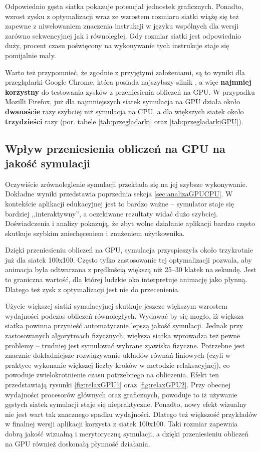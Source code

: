 Odpowiednio gęsta siatka pokazuje potencjał jednostek graficznych. Ponadto,
wzrost zysku z optymalizacji wraz ze wzrostem rozmiaru siatki wiążę się też
zapewne z niwelowaniem znaczenia instrukcji w języku  wspólnych
dla wersji zarówno sekwencyjnej jak i równoległej. Gdy rozmiar siatki jest
odpowiednio duży, procent czasu poświęcony na wykonywanie tych instrukcje staje
się pomijalnie mały.

Warto też przypomnieć, że zgodnie z przyjętymi założeniami, są to wyniki dla
przeglądarki Google Chrome, która posiada najszybszy silnik \js, a więc
\textbf{najmniej korzystny} do testowania zysków z przeniesienia obliczeń na
GPU. W przypadku Mozilli Firefox, już dla najmniejszych siatek symulacja na GPU
działa około \textbf{dwanaście} razy szybciej niż symulacja na CPU, a dla
większych siatek około \textbf{trzydzieści} razy (por. tabele
\ref{tab:przegladarki} oraz \ref{tab:przegladarkiGPU}).

\subsection{Wpływ przeniesienia obliczeń na GPU na jakość symulacji}

Oczywiście zrównoleglenie symulacji przekłada się na jej szybsze wykonywanie.
Dokładne wyniki przedstawia poprzednia sekcja \ref{sec:analizaGPUCPU}. W
kontekście aplikacji edukacyjnej jest to bardzo ważne -- symulator staje się
bardziej ,,interaktywny'', a oczekiwane rezultaty widać dużo szybciej.
Doświadczenia i analizy pokazują, że zbyt wolne działanie aplikacji bardzo
często skutkuje szybkim zniechęceniem i znużeniem użytkownika.

Dzięki przeniesieniu obliczeń na GPU, symulacja przyspieszyła około trzykrotnie
już dla siatek 100x100. Często tylko zastosowanie tej optymalizacji pozwala, aby
animacja była odtwarzana z prędkością większą niż 25--30 klatek na sekundę. Jest
to graniczna wartość, dla której ludzkie oko interpretuje animację jako płynną.
Dlatego też zysk z optymalizacji jest nie do przecenienia.

Użycie większej siatki symulacyjnej skutkuje jeszcze większym wzrostem
wydajności podczas obliczeń równoległych. Wydawać by się mogło, iż większa
siatka powinna przynieść automatycznie lepszą jakość symulacji. Jednak przy
zastosowanych algorytmach fizycznych, większa siatka wprowadza też pewne
problemy -- trudniej jest symulować wybrane zjawiska fizyczne. Potrzebne jest
znacznie dokładniejsze rozwiązywanie układów równań liniowych (czyli w praktyce
wykonanie większej liczby kroków w metodzie relaksacyjnej), co powoduje
zwielokrotnienie czasu potrzebnego na obliczenia. Efekt ten przedstawiają
rysunki \ref{fig:relaxGPU1} oraz \ref{fig:relaxGPU2}. Przy obecnej wydajności
procesorów głównych oraz graficznych, powoduje to iż używanie gęstych siatek
symulacji staje się niepraktyczne. Ponadto, nowy efekt wizualny nie jest wart
tak znacznego spadku wydajności. Dlatego też większość przykładów w finalnej
wersji aplikacji korzysta z siatek 100x100. Taki rozmiar zapewnia dobrą jakość
wizualną i merytoryczną symulacji, a dzięki przeniesieniu obliczeń na GPU
również doskonałą płynność działania.

